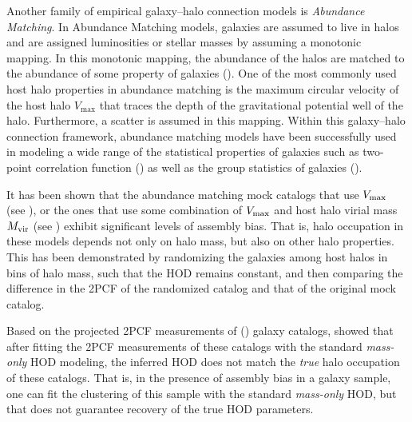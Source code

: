 \documentclass[12pt, preprint]{aastex}
\begin{document}
Another family of empirical galaxy--halo connection models is \emph{Abundance} \emph{Matching}. In Abundance Matching models, galaxies are assumed to live in halos and are assigned luminosities or stellar masses by assuming a monotonic mapping. In this monotonic mapping, the abundance of the halos are matched to the abundance of some property of galaxies (\citealt{kravtsov2004,vale2004,tasitsiomi2004,conroy2009,guo2010,wetzel2010,Neisten2011,watson2012,rodriguez2012,kravstov2013,mao2015,chavez2016}). 
One of the most commonly used host halo properties in abundance matching is the maximum circular velocity of the host halo $V_\mathrm{max}$ that traces the depth of the gravitational potential well of the halo. Furthermore, a scatter is assumed in this mapping. Within this galaxy--halo connection framework, abundance matching models have been successfully used in modeling a wide range of the statistical properties of galaxies such as two-point correlation function (\citealt{reddick2013,lehman2015,hod_vs_sham}) as well as the group statistics of galaxies (\citealt{sham_gmf}). 

It has been shown that the abundance matching mock catalogs that use $V_{\rm max}$ (see \citealt{hw2013,arz2014}), or the ones that use some combination of $V_{\rm max}$ and host halo virial mass $M_{\rm vir}$ (see \citealt{lehman2015}) exhibit significant levels of assembly bias. 
That is, halo occupation in these models depends not only on halo mass, but also on other halo properties. This has been demonstrated by randomizing the galaxies among host halos in bins of halo mass, such that the HOD remains constant, and then comparing the difference in the 2PCF of the randomized catalog and that of the original mock catalog. 

Based on the projected 2PCF measurements of (\citealt{hw2013}) galaxy catalogs, \citet{arz2014} showed that after fitting the 2PCF measurements of these catalogs with the standard \emph{mass-only} HOD modeling, the inferred HOD does not match the \emph{true} halo occupation of these catalogs. That is, in the presence of assembly bias in a galaxy sample, one can fit the clustering of this sample with the standard \emph{mass-only} HOD, but that does not guarantee recovery of the true HOD parameters.
\end{document}

